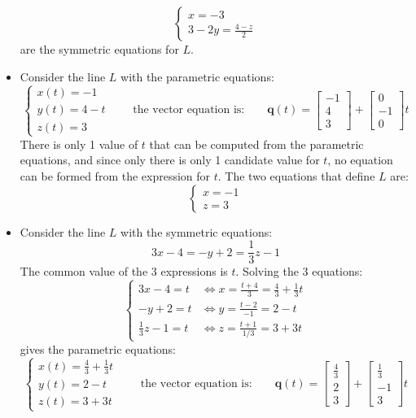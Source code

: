 \documentclass{article}
\begin{document}
\begin{itemize}
\[\left\{\begin{array}{c}
x = -3 \\ 
3 - 2y = \frac{4 - z}{2}
\end{array}\right.\]
are the symmetric equations for \(L\).
\item Consider the line \(L\) with the parametric equations: 
\[\left\{\begin{array}{c}
x(t) = -1 \\ 
y(t) = 4 - t \\ 
z(t) = 3
\end{array}\right.
\quad\quad\text{the vector equation is:}\quad\quad
\mathbf{q}(t) = \begin{bmatrix} -1 \\ 4 \\ 3 \end{bmatrix} + \begin{bmatrix} 0 \\ -1 \\ 0 \end{bmatrix}t\]
There is only 1 value of \(t\) that can be computed from the parametric equations, and since only there is only 1 candidate value for \(t\), no equation can be formed from the expression for \(t\). The two equations that define \(L\) are: 
\[\left\{\begin{array}{c}
x = -1 \\ 
z = 3 
\end{array}\right.\]
\item Consider the line \(L\) with the symmetric equations: 
\[3x - 4 = -y + 2 = \frac{1}{3}z - 1\]
The common value of the 3 expressions is \(t\). Solving the 3 equations:
\[\left\{\begin{array}{cc}
3x - 4 = t & \iff x = \frac{t + 4}{3} = \frac{4}{3} + \frac{1}{3}t \\ 
-y + 2 = t & \iff y = \frac{t - 2}{-1} = 2 - t \\ 
\frac{1}{3}z - 1 = t & \iff z = \frac{t + 1}{1/3} = 3 + 3t
\end{array}\right.\]
gives the parametric equations:
\[\left\{\begin{array}{c}
x(t) = \frac{4}{3} + \frac{1}{3}t \\ 
y(t) = 2 - t \\ 
z(t) = 3 + 3t 
\end{array}\right.
\quad\quad\text{the vector equation is:}\quad\quad
\mathbf{q}(t) = \begin{bmatrix} \frac{4}{3} \\ 2 \\ 3 \end{bmatrix} + \begin{bmatrix} \frac{1}{3} \\ -1 \\ 3 \end{bmatrix}t\]

\end{itemize}
\end{document}
